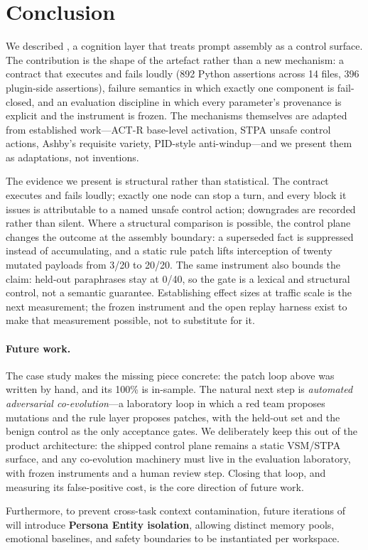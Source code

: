 \section{Conclusion}\label{sec:conclusion}

We described \system{}, a cognition layer that treats prompt assembly as a
control surface. The contribution is the shape of the artefact rather than a new
mechanism: a contract that executes and fails loudly (892 Python assertions
across 14 files, 396 plugin-side assertions), failure semantics in which exactly
one component is fail-closed, and an evaluation discipline in which every
parameter's provenance is explicit and the instrument is frozen. The mechanisms
themselves are adapted from established work---ACT-R base-level activation, STPA
unsafe control actions, Ashby's requisite variety, PID-style anti-windup---and
we present them as adaptations, not inventions.

The evidence we present is structural rather than statistical. The contract
executes and fails loudly; exactly one node can stop a turn, and every block it
issues is attributable to a named unsafe control action; downgrades are recorded
rather than silent. Where a structural comparison is possible, the control plane
changes the outcome at the assembly boundary: a superseded fact is suppressed
instead of accumulating, and a static rule patch lifts interception of twenty
mutated payloads from 3/20 to 20/20. The same instrument also bounds the claim:
held-out paraphrases stay at 0/40, so the gate is a lexical and structural
control, not a semantic guarantee. Establishing effect sizes at traffic scale is
the next measurement; the frozen instrument and the open replay harness exist to
make that measurement possible, not to substitute for it.

\paragraph{Future work.} The case study makes the missing piece concrete: the
patch loop above was written by hand, and its 100\% is in-sample. The natural next
step is \emph{automated adversarial co-evolution}---a laboratory loop in which a
red team proposes mutations and the rule layer proposes patches, with the held-out
set and the benign control as the only acceptance gates. We deliberately keep
this out of the product architecture: the shipped control plane remains a static
VSM/STPA surface, and any co-evolution machinery must live in the evaluation
laboratory, with frozen instruments and a human review step. Closing that loop,
and measuring its false-positive cost, is the core direction of future work.

Furthermore, to prevent cross-task context contamination, future iterations of
\system{} will introduce \textbf{Persona Entity isolation}, allowing distinct
memory pools, emotional baselines, and safety boundaries to be instantiated per
workspace.
